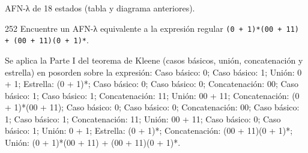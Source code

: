 \documentclass[11pt]{article}
\begin{document}
\resp AFN-λ de 18 estados (tabla y diagrama anteriores).


\begin{ejercicio}{252}{}
Encuentre un AFN-λ equivalente a la expresión regular \texttt{(0 + 1)*(00 + 11) + (00 + 11)(0 + 1)*}.
\end{ejercicio}
\proc Se aplica la Parte I del teorema de Kleene (casos básicos, unión, concatenación y estrella) en posorden sobre la expresión: Caso básico: 0; Caso básico: 1; Unión: 0 + 1; Estrella: (0 + 1)*; Caso básico: 0; Caso básico: 0; Concatenación: 00; Caso básico: 1; Caso básico: 1; Concatenación: 11; Unión: 00 + 11; Concatenación: (0 + 1)*(00 + 11); Caso básico: 0; Caso básico: 0; Concatenación: 00; Caso básico: 1; Caso básico: 1; Concatenación: 11; Unión: 00 + 11; Caso básico: 0; Caso básico: 1; Unión: 0 + 1; Estrella: (0 + 1)*; Concatenación: (00 + 11)(0 + 1)*; Unión: (0 + 1)*(00 + 11) + (00 + 11)(0 + 1)*.
\end{document}
